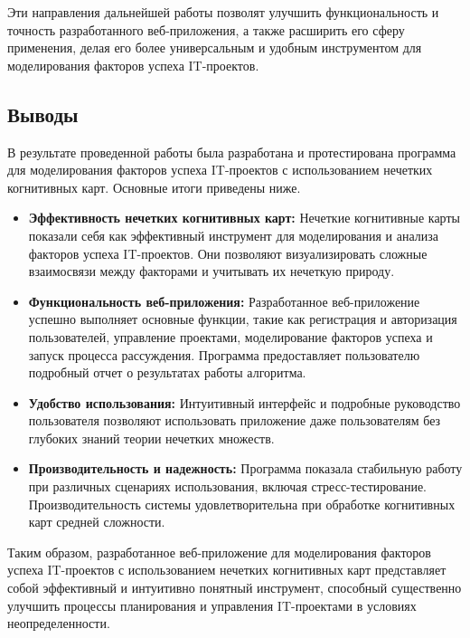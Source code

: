 \documentclass{article}
\begin{document}
    Эти направления дальнейшей работы позволят улучшить функциональность и точность разработанного веб-приложения, а также расширить его сферу применения, делая его более универсальным и удобным инструментом для моделирования факторов успеха IT-проектов.

    \subsection{Выводы}
    В результате проведенной работы была разработана и протестирована программа для моделирования факторов успеха IT-проектов с использованием нечетких когнитивных карт. Основные итоги приведены ниже.

    \begin{itemize}
        \item \textbf{Эффективность нечетких когнитивных карт:} Нечеткие когнитивные карты показали себя как эффективный инструмент для моделирования и анализа факторов успеха IT-проектов. Они позволяют визуализировать сложные взаимосвязи между факторами и учитывать их нечеткую природу.
        \item \textbf{Функциональность веб-приложения:} Разработанное веб-приложение успешно выполняет основные функции, такие как регистрация и авторизация пользователей, управление проектами, моделирование факторов успеха и запуск процесса рассуждения. Программа предоставляет пользователю подробный отчет о результатах работы алгоритма.
        \item \textbf{Удобство использования:} Интуитивный интерфейс и подробные руководство пользователя позволяют использовать приложение даже пользователям без глубоких знаний теории нечетких множеств.
        \item \textbf{Производительность и надежность:} Программа показала стабильную работу при различных сценариях использования, включая стресс-тестирование. Производительность системы удовлетворительна при обработке когнитивных карт средней сложности.
    \end{itemize}

    Таким образом, разработанное веб-приложение для моделирования факторов успеха IT-проектов с использованием нечетких когнитивных карт представляет собой эффективный и интуитивно понятный инструмент, способный существенно улучшить процессы планирования и управления IT-проектами в условиях неопределенности.

    \newpage
\end{document}
